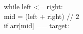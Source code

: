 \documentclass[preview]{standalone}
\begin{document}
while left <= right:\\mid = (left + right) // 2\\if arr[mid] == target:\\
\end{document}
